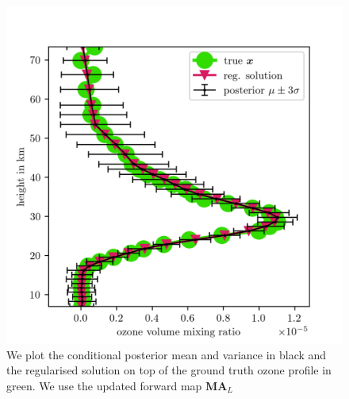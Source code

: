 \begin{figure}[ht!]
	\centering
	\includegraphics{SecRecResinclReg.png}
	\caption[Ozone posterior mean and variance and the regularised solution compared to the ground truth.]{We plot the conditional posterior mean and variance in black and the regularised solution on top of the ground truth ozone profile in green. We use the updated forward map $\bm{M}\bm{A}_L$}
	\label{fig:O3SolplsReg}
\end{figure}




